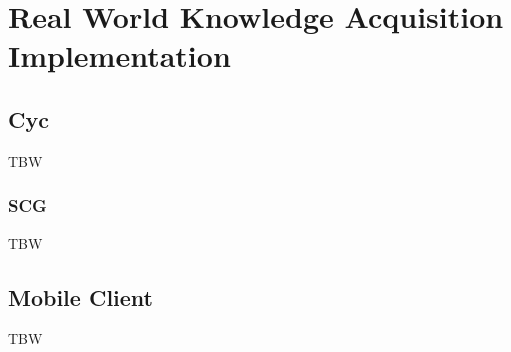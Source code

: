 % 
\chapter{Real World Knowledge Acquisition Implementation}
\label{chapter:implementation}

\section{Cyc}
\label{section:Cyc}

TBW

\subsection{SCG}
\label{section:scg}
TBW

\section{Mobile Client}
\label{section:app}
TBW
